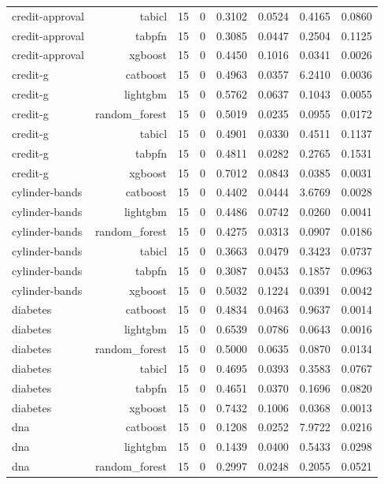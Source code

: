 \begin{table}[htbp]
\begin{tabular}{lrrrrrrr}
credit-approval & tabicl & 15 & 0 & 0.3102 & 0.0524 & 0.4165 & 0.0860 \\
credit-approval & tabpfn & 15 & 0 & 0.3085 & 0.0447 & 0.2504 & 0.1125 \\
credit-approval & xgboost & 15 & 0 & 0.4450 & 0.1016 & 0.0341 & 0.0026 \\
credit-g & catboost & 15 & 0 & 0.4963 & 0.0357 & 6.2410 & 0.0036 \\
credit-g & lightgbm & 15 & 0 & 0.5762 & 0.0637 & 0.1043 & 0.0055 \\
credit-g & random\_forest & 15 & 0 & 0.5019 & 0.0235 & 0.0955 & 0.0172 \\
credit-g & tabicl & 15 & 0 & 0.4901 & 0.0330 & 0.4511 & 0.1137 \\
credit-g & tabpfn & 15 & 0 & 0.4811 & 0.0282 & 0.2765 & 0.1531 \\
credit-g & xgboost & 15 & 0 & 0.7012 & 0.0843 & 0.0385 & 0.0031 \\
cylinder-bands & catboost & 15 & 0 & 0.4402 & 0.0444 & 3.6769 & 0.0028 \\
cylinder-bands & lightgbm & 15 & 0 & 0.4486 & 0.0742 & 0.0260 & 0.0041 \\
cylinder-bands & random\_forest & 15 & 0 & 0.4275 & 0.0313 & 0.0907 & 0.0186 \\
cylinder-bands & tabicl & 15 & 0 & 0.3663 & 0.0479 & 0.3423 & 0.0737 \\
cylinder-bands & tabpfn & 15 & 0 & 0.3087 & 0.0453 & 0.1857 & 0.0963 \\
cylinder-bands & xgboost & 15 & 0 & 0.5032 & 0.1224 & 0.0391 & 0.0042 \\
diabetes & catboost & 15 & 0 & 0.4834 & 0.0463 & 0.9637 & 0.0014 \\
diabetes & lightgbm & 15 & 0 & 0.6539 & 0.0786 & 0.0643 & 0.0016 \\
diabetes & random\_forest & 15 & 0 & 0.5000 & 0.0635 & 0.0870 & 0.0134 \\
diabetes & tabicl & 15 & 0 & 0.4695 & 0.0393 & 0.3583 & 0.0767 \\
diabetes & tabpfn & 15 & 0 & 0.4651 & 0.0370 & 0.1696 & 0.0820 \\
diabetes & xgboost & 15 & 0 & 0.7432 & 0.1006 & 0.0368 & 0.0013 \\
dna & catboost & 15 & 0 & 0.1208 & 0.0252 & 7.9722 & 0.0216 \\
dna & lightgbm & 15 & 0 & 0.1439 & 0.0400 & 0.5433 & 0.0298 \\
dna & random\_forest & 15 & 0 & 0.2997 & 0.0248 & 0.2055 & 0.0521 \\

\end{tabular}
\end{table}
